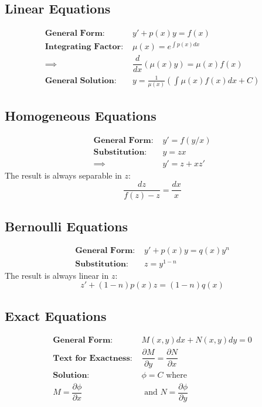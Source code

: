 \documentclass[10pt,portrait, leqno]{article}
\begin{document}
\begin{multicols}{2}
\subsection*{Linear Equations}
\begin{align}
\textbf{General Form:\ }& y'+p(x)y=f(x)\\
\textbf{Integrating Factor:\ }& \mu(x) = e^{\int p(x)dx}\\
\implies & \dfrac{d}{dx}\left( \mu(x) y \right) = \mu(x) f(x)\\
\textbf{General Solution:\ }& y=\frac{1}{\mu(x)}\left( \int \mu(x) f(x) dx + C\right)
\end{align}
\subsection*{Homogeneous Equations}
\begin{align}
\textbf{General Form:\ }& y'=f(y/x)\\
\textbf{Substitution:\ }& y=zx \\ \implies & y'=z + xz'
\end{align}
The result is always separable in $z$: 
\begin{equation}
\dfrac{dz}{f(z)-z} = \dfrac{dx}{x}
\end{equation}
\subsection*{Bernoulli Equations}
\begin{align}
\textbf{General Form:\ }& y'+p(x)y=q(x)y^n\\
\textbf{Substitution:\ }& z = y^{1-n}
\end{align}
The result is always linear in $z$:
\begin{equation}
 z' +(1-n)p(x) z = (1-n)q(x)
\end{equation}
\subsection*{Exact Equations}
\begin{align}
\textbf{General Form:\ }& M(x,y)dx + N(x,y)dy = 0 \\
\textbf{Text for Exactness:\ }& \dfrac{\partial M}{\partial y}=\dfrac{\partial N}{\partial x}\\
\textbf{Solution:\ }& \phi=C\text{ where }\\
 M=\dfrac{\partial \phi}{\partial x}&\text{ and } N=\dfrac{\partial \phi}{\partial y}
\end{align}
\columnbreak


\end{multicols}
\end{document}
